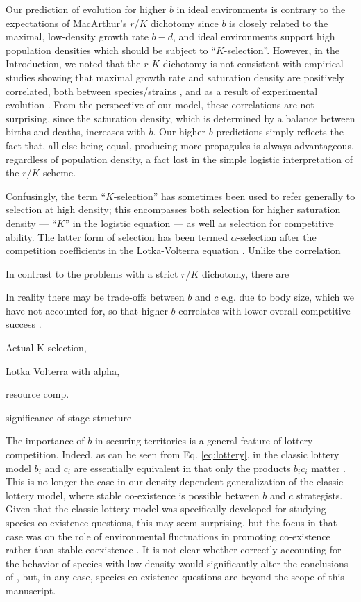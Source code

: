 \documentclass[11pt]{article}
\begin{document}
Our prediction of evolution for higher $b$ in ideal environments is contrary to the expectations of MacArthur's $r$/$K$ dichotomy \citep{macarthur_1962} since $b$ is closely related to the maximal, low-density growth rate $b-d$, and ideal environments support high population densities which should be subject to ``$K$-selection''. However, in the Introduction, we noted that the $r$-$K$ dichotomy is not consistent with empirical studies showing that maximal growth rate and saturation density are positively correlated, both between species/strains \citep{luckinbill_1979,kuno_1991,hendriks_2005,fitzsimmons_2010}, and as a result of experimental evolution \citep{luckinbill_1978,luckinbill_1979}. From the perspective of our model, these correlations are not surprising, since the saturation density, which is determined by a balance between births and deaths, increases with $b$. Our higher-$b$ predictions simply reflects the fact that, all else being equal, producing more propagules is always advantageous, regardless of population density, a fact lost in the simple logistic interpretation of the $r$/$K$ scheme. 

Confusingly, the term ``$K$-selection'' has sometimes been used to refer generally to selection at high density; this encompasses both selection for higher saturation density --- ``$K$'' in the logistic equation --- as well as selection for competitive ability. The latter form of selection has been termed $\alpha$-selection after the competition coefficients in the Lotka-Volterra equation \citep{gill_1974,case_1974,joshi_2001}. Unlike the correlation 

In contrast to the problems with a strict $r$/$K$ dichotomy, there are 


In reality there may be trade-offs between $b$ and $c$ e.g. due to body size, which we have not accounted for, so that higher $b$ correlates with lower overall competitive success \cite{luckinbill_1979}.

Actual K selection, 

Lotka Volterra with alpha, 

resource comp. 

significance of stage structure

The importance of $b$ in securing territories is a general feature of lottery competition. Indeed, as can be seen from Eq. \eqref{eq:lottery}, in the classic lottery model $b_i$ and $c_i$ are essentially equivalent in that only the products $b_i c_i$ matter \citep{chesson_1981}. This is no longer the case in our density-dependent generalization of the classic lottery model, where stable co-existence is possible between $b$ and $c$ strategists. Given that the classic lottery model was specifically developed for studying species co-existence questions, this may seem surprising, but the focus in that case was on the role of environmental fluctuations in promoting co-existence rather than stable coexistence \citep{chesson_1981}. It is not clear whether correctly accounting for the behavior of species with low density would significantly alter the conclusions of \cite{chesson_1981}, but, in any case, species co-existence questions are beyond the scope of this manuscript. 
\end{document}
